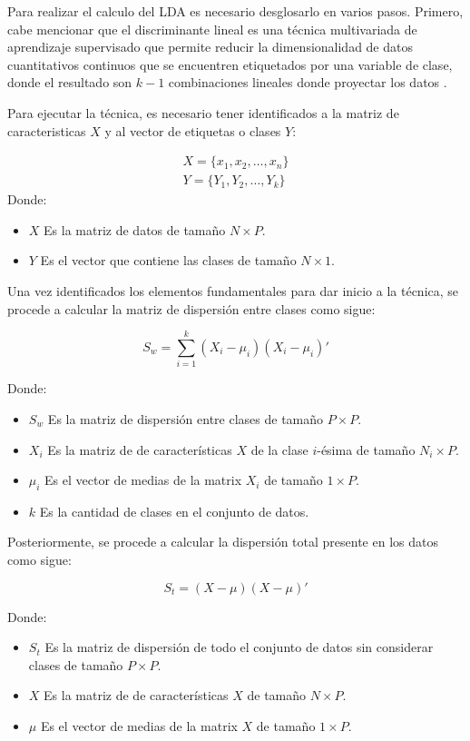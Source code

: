 \documentclass[11pt, letterpaper]{article}
\begin{document}
	Para realizar el calculo del LDA  es necesario desglosarlo en varios pasos. Primero, cabe mencionar que el discriminante lineal es una técnica multivariada de aprendizaje supervisado que permite reducir la dimensionalidad de datos cuantitativos continuos que se encuentren etiquetados por una variable de clase, donde el resultado son $k-1$ combinaciones lineales donde proyectar los datos \cite{johnson2007}. 
	
	Para ejecutar la técnica, es necesario tener identificados a la matriz de caracteristicas $X$ y al vector de etiquetas o clases $Y$: 
	
	$$
	 \begin{matrix}
	 	X = \{x_1,x_2,\dots,x_n\} \\
	 	Y = \{Y_1, Y_2,\dots ,Y_k\}
	 \end{matrix}
	$$
	Donde: 
	\begin{itemize}
		\item $X$ Es la matriz de datos de tamaño $N\times P$.
		\item $Y$ Es el vector que contiene las clases de tamaño $N\times 1 $.
	\end{itemize}
	

Una vez identificados los elementos fundamentales para dar inicio a la técnica, se procede a calcular la matriz de dispersión entre clases como sigue:

$$S_w = \sum_{i = 1}^{k} {(X_i-\mu_i)(X_i-\mu_i)' }$$

	Donde: 
	\begin{itemize}
		\item $S_w$ Es la matriz de dispersión entre clases de tamaño $P\times P$.
		\item $X_i$ Es la matriz de de características $X$ de la clase $i$-ésima de tamaño $N_i \times P$.
		\item $\mu_i$ Es el vector de medias de la matrix $X_i$ de tamaño $1\times P$.
		\item $k$ Es la cantidad de clases en el conjunto de datos.
	\end{itemize}

\newpage

Posteriormente, se procede a calcular la dispersión total presente en los datos como sigue:

$$S_t = {(X-\mu)(X-\mu)' }$$

Donde: 
\begin{itemize}
	\item $S_t$ Es la matriz de dispersión de todo el conjunto de datos sin considerar clases de tamaño $P\times P$.
	\item $X$ Es la matriz de de características $X$ de tamaño $N \times P$.
	\item $\mu$ Es el vector de medias de la matrix $X$ de tamaño $1\times P$.
\end{itemize}
\end{document}
